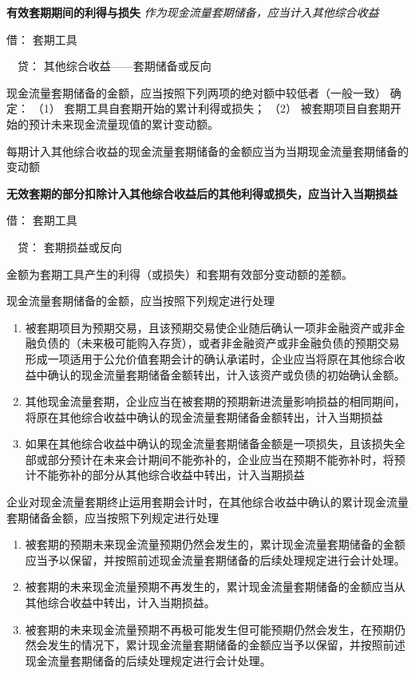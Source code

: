 \documentclass[UTF8,12pt]{ctexart}
\newenvironment{Dr}{\noindent 借：}{\par}
\newenvironment{Cr}{\noindent \ \ 贷：}{\par}
\numberwithin{equation}{section} %
\numberwithin{figure}{section}
\numberwithin{table}{section}
\begin{document}
	\textbf{有效套期期间的利得与损失}
	\textit{作为现金流量套期储备，应当计入其他综合收益}
	
	\begin{Dr}
		套期工具
	\end{Dr}
	\begin{Cr}
		其他综合收益——套期储备或反向
	\end{Cr}

	
	现金流量套期储备的金额，应当按照下列两项的绝对额中较低者（一般一致） 确定：
	（1）	套期工具自套期开始的累计利得或损失；
	（2）	被套期项目自套期开始的预计未来现金流量现值的累计变动额。
	
	每期计入其他综合收益的现金流量套期储备的金额应当为当期现金流量套期储备的变动额
	
	\textbf{无效套期的部分扣除计入其他综合收益后的其他利得或损失，应当计入当期损益}
	
	\begin{Dr}
		套期工具
	\end{Dr}
	\begin{Cr}
		套期损益或反向
	\end{Cr}
	
	金额为套期工具产生的利得（或损失）和套期有效部分变动额的差额。
	
	现金流量套期储备的金额，应当按照下列规定进行处理
	\begin{enumerate}
		\item 被套期项目为预期交易，且该预期交易使企业随后确认一项非金融资产或非金融负债的（未来极可能购入存货），或者非金融资产或非金融负债的预期交易形成一项适用于公允价值套期会计的确认承诺时，企业应当将原在其他综合收益中确认的现金流量套期储备金额转出，计入该资产或负债的初始确认金额。
		
		\item 其他现金流量套期，企业应当在被套期的预期新进流量影响损益的相同期间，将原在其他综合收益中确认的现金流量套期储备金额转出，计入当期损益
		
		\item 如果在其他综合收益中确认的现金流量套期储备金额是一项损失，且该损失全部或部分预计在未来会计期间不能弥补的，企业应当在预期不能弥补时，将预计不能弥补的部分从其他综合收益中转出，计入当期损益
	\end{enumerate}
	
	企业对现金流量套期终止运用套期会计时，在其他综合收益中确认的累计现金流量套期储备金额，应当按照下列规定进行处理
	\begin{enumerate}
		\item 被套期的预期未来现金流量预期仍然会发生的，累计现金流量套期储备的金额应当予以保留，并按照前述现金流量套期储备的后续处理规定进行会计处理。
		
		\item 被套期的未来现金流量预期不再发生的，累计现金流量套期储备的金额应当从其他综合收益中转出，计入当期损益。
		
		\item 被套期的未来现金流量预期不再极可能发生但可能预期仍然会发生，在预期仍然会发生的情况下，累计现金流量套期储备的金额应当予以保留，并按照前述现金流量套期储备的后续处理规定进行会计处理。
	\end{enumerate}
	
\end{document}
